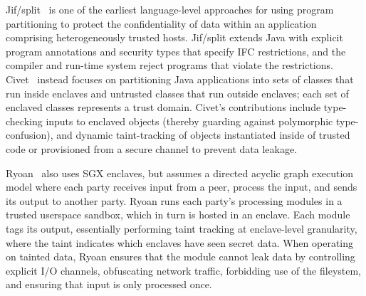 


%
%
Jif/split~\cite{jif} is one of the earliest language-level approaches for using
program partitioning to protect the confidentiality of data within an
application comprising heterogeneously trusted hosts.
%
Jif/split extends Java with explicit program annotations and security types
that specify IFC restrictions, and the compiler and run-time system reject
programs that violate the restrictions. 
%
Civet~\cite{civet} instead focuses on partitioning Java applications into sets of classes
that run inside enclaves and untrusted classes that run outside enclaves; each
set of enclaved classes represents a trust domain.
Civet's contributions include type-checking inputs to enclaved
objects (thereby guarding against polymorphic type-confusion), and dynamic
taint-tracking of objects instantiated inside of trusted code or provisioned
from a secure channel to prevent data leakage.


Ryoan~\cite{ryoan} also uses SGX enclaves, but assumes a directed acyclic graph
execution model where each party receives input from a peer, process the input,
and sends its output to another party.
%
Ryoan runs each party's processing modules in a trusted userspace sandbox,
which in turn is hosted in an enclave.
%
Each module tags its output, essentially performing taint tracking at
enclave-level granularity, where the taint indicates which enclaves have seen
secret data.
%
When operating on tainted data, Ryoan ensures that the module cannot leak data
by controlling explicit I/O channels, obfuscating network traffic, forbidding
use of the fileystem, and ensuring that input is only processed once.


